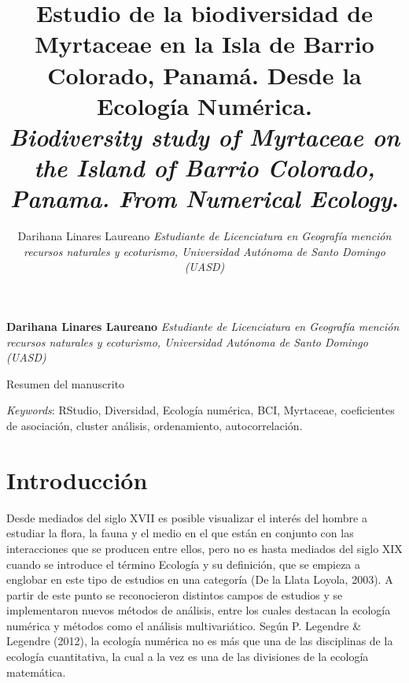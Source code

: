 \documentclass[11pt,]{article}
\title{Estudio de la biodiversidad de Myrtaceae en la Isla de Barrio Colorado,
Panamá. Desde la Ecología Numérica.\\
\emph{Biodiversity study of Myrtaceae on the Island of Barrio Colorado,
Panama. From Numerical Ecology}.  }
\author{\Large Darihana Linares Laureano\vspace{0.05in} \newline\normalsize\emph{Estudiante de Licenciatura en Geografía mención recursos naturales y
ecoturismo, Universidad Autónoma de Santo Domingo (UASD)}  }
\date{}
\newcommand*{\authorfont}{\fontfamily{phv}\selectfont}
\renewenvironment{abstract}
 {{%
    \setlength{\leftmargin}{0mm}
    \setlength{\rightmargin}{\leftmargin}%
  }%
  \relax}
 {\endlist}
\begin{document}
	
%

{%
\setlength{\parindent}{0pt}
\thispagestyle{plain}
{\fontsize{18}{20}\selectfont\raggedright 
\maketitle  %

}

{
   \vskip 13.5pt\relax \normalsize\fontsize{11}{12} 
\textbf{\authorfont Darihana Linares Laureano} \hskip 15pt \emph{\small Estudiante de Licenciatura en Geografía mención recursos naturales y
ecoturismo, Universidad Autónoma de Santo Domingo (UASD)}   

}

}








\begin{abstract}

    \hbox{\vrule height .2pt width 39.14pc}

    \vskip 8.5pt %

\noindent Resumen del manuscrito


\vskip 8.5pt \noindent \emph{Keywords}: RStudio, Diversidad, Ecología numérica, BCI, Myrtaceae, coeficientes de
asociación, cluster análisis, ordenamiento, autocorrelación. \par

    \hbox{\vrule height .2pt width 39.14pc}



\end{abstract}


\vskip 6.5pt


\noindent  \section{Introducción}\label{introducciuxf3n}

Desde mediados del siglo XVII es posible visualizar el interés del
hombre a estudiar la flora, la fauna y el medio en el que están en
conjunto con las interacciones que se producen entre ellos, pero no es
hasta mediados del siglo XIX cuando se introduce el término Ecología y
su definición, que se empieza a englobar en este tipo de estudios en una
categoría (De la Llata Loyola, 2003). A partir de este punto se
reconocieron distintos campos de estudios y se implementaron nuevos
métodos de análisis, entre los cuales destacan la ecología numérica y
métodos como el análisis multivariático. Según P. Legendre \& Legendre
(2012), la ecología numérica no es más que una de las disciplinas de la
ecología cuantitativa, la cual a la vez es una de las divisiones de la
ecología matemática.
\end{document}
